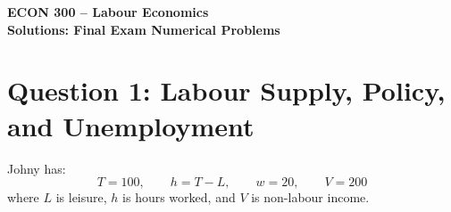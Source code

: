 \documentclass[12pt]{article}
\begin{document}
\begin{center}
{\LARGE \textbf{ECON 300 -- Labour Economics}}\\[0.4em]
{\Large \textbf{Solutions: Final Exam Numerical Problems }}\\[0.4em]

\end{center}

\vspace{0.5em}

\section*{Question 1: Labour Supply, Policy, and Unemployment}

Johny has:
\[
T=100,\qquad h=T-L,\qquad w=20,\qquad V=200
\]
where \(L\) is leisure, \(h\) is hours worked, and \(V\) is non-labour income.
\end{document}
